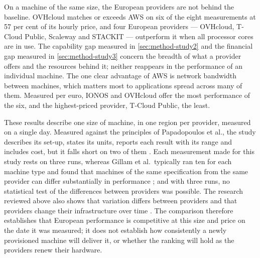 On a machine of the same size, the European providers are not behind the
baseline. OVHcloud matches or exceeds \acs{AWS} on six of the eight measurements at
57 per cent of its hourly price, and four European providers --- OVHcloud,
T-Cloud Public, Scaleway and STACKIT --- outperform it when all processor cores
are in use.
The capability gap measured in \cref{sec:method-study2} and the financial gap
measured in \cref{sec:method-study3} concern the breadth of what a provider
offers and the resources behind it; neither reappears in the performance of an
individual machine. The one clear advantage of \acs{AWS} is network bandwidth
between machines, which matters most to applications spread across many of them.
Measured per euro, IONOS and OVHcloud offer the most performance of the six, and
the highest-priced provider, T-Cloud Public, the least.

These results describe one size of machine, in one region per provider, measured
on a single day. Measured against the principles of Papadopoulos et al., the study
describes its set-up, states its units, reports each result with its range and
includes cost, but it falls short on two of them
\cite{Papadopoulos_Principles_2021}. Each measurement made for this study rests on
three runs, whereas Gillam et al.\ typically ran ten for each machine type and
found that machines of the same specification from the same provider can differ
substantially in performance \cite{Gillam_FairBenchmarking_2013}; and with three
runs, no statistical test of the differences between providers was possible. The
research reviewed above also shows that variation differs between providers and
that providers change their infrastructure over time
\cite{LeitnerCito_Chaos_2016}. The comparison therefore establishes that European
performance is competitive at this size and price on the date it was measured; it
does not establish how consistently a newly provisioned machine will deliver it,
or whether the ranking will hold as the providers renew their hardware.
